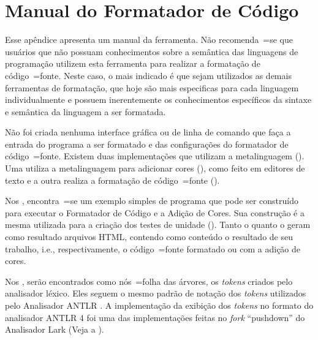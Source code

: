 

\chapter[Manual do Formatador]{Manual do Formatador de Código}
\label{manualDoFormatadorDeCodigo}

Esse apêndice apresenta um manual da ferramenta.
Não recomenda~=se que usuários que não possuam conhecimentos sobre a semântica das linguagens de programação\advisor{}{,
} utilizem esta ferramenta para realizar a formatação de código~=fonte.
Neste caso,
o mais indicado é que sejam utilizados as demais ferramentas de formatação,
que hoje são mais especificas para cada linguagem individualmente e
possuem inerentemente os conhecimentos específicos da sintaxe e
semântica da linguagem a ser formatada.

Não foi criada nenhuma interface gráfica ou
de linha de comando que faça a entrada do programa a ser formatado e
das configurações do formatador de código~=fonte.
Existem duas implementações que utilizam a metalinguagem ().
Uma utiliza a metalinguagem para adicionar cores (),
como feito em editores de texto e
a outra realiza a formatação de código~=fonte ().

Nos ,
encontra~=se um exemplo simples de programa que pode ser construído para executar o Formatador de Código e
a Adição de Cores.
Sua construção é a mesma utilizada para a criação dos testes de unidade ().
Tanto o  quanto o  geram como resultado arquivos HTML,
contendo como conteúdo o resultado de seu trabalho,
i.e., respectivamente,
o código~=fonte formatado ou
com a adição de cores.

Nos ,
serão encontrados como nós~=folha das árvores,
os \textit{tokens} criados pelo analisador léxico.
Eles seguem o mesmo padrão de notação dos \textit{tokens} utilizados pelo Analisador ANTLR \cite{antlrBookTerrentParr}.
A implementação da exibição dos \textit{tokens} no formato do analisador ANTLR 4 foi uma das implementações feitas no \textit{fork} ``pushdown'' do Analisador Lark (Veja a ).

